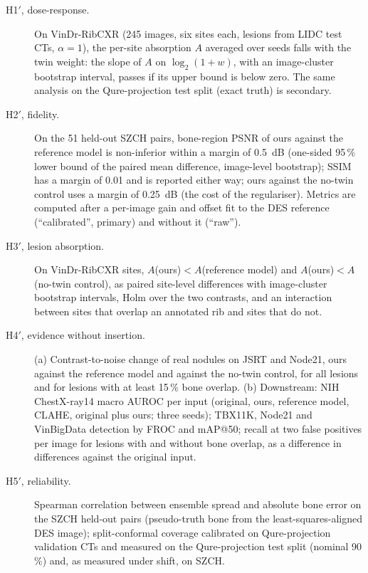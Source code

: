 \begin{description}
\item[H1$'$, dose-response.] On VinDr-RibCXR (245 images, six sites each, lesions from LIDC test CTs, $\alpha=1$), the per-site absorption $A$ averaged over
 seeds falls with the twin weight: the slope of $A$ on $\log_2(1+w)$, with an image-cluster bootstrap interval, passes if its upper bound is below zero.
 The same analysis on the Qure-projection test split (exact truth) is secondary.
\item[H2$'$, fidelity.] On the 51 held-out SZCH pairs, bone-region PSNR of ours against the reference model is non-inferior within a margin of 0.5~dB
 (one-sided 95\,\% lower bound of the paired mean difference, image-level bootstrap); SSIM has a margin of 0.01 and is reported either way; ours against the
 no-twin control uses a margin of 0.25~dB (the cost of the regulariser). Metrics are computed after a per-image gain and offset fit to the DES reference
 (``calibrated'', primary) and without it (``raw'').
\item[H3$'$, lesion absorption.] On VinDr-RibCXR sites, $A$(ours)$<A$(reference model) and $A$(ours)$<A$(no-twin control), as paired site-level
 differences with image-cluster bootstrap intervals, Holm over the two contrasts, and an interaction between sites that overlap an annotated rib and sites
 that do not.
\item[H4$'$, evidence without insertion.] (a) Contrast-to-noise change of real nodules on JSRT and Node21, ours against the reference model and against
 the no-twin control, for all lesions and for lesions with at least 15\,\% bone overlap. (b) Downstream: NIH ChestX-ray14 macro AUROC per input
 (original, ours, reference model, CLAHE, original plus ours; three seeds); TBX11K, Node21 and VinBigData detection by FROC and mAP@50; recall at two false
 positives per image for lesions with and without bone overlap, as a difference in differences against the original input.
\item[H5$'$, reliability.] Spearman correlation between ensemble spread and absolute bone error on the SZCH held-out pairs (pseudo-truth bone from the
 least-squares-aligned DES image); split-conformal coverage calibrated on Qure-projection validation CTs and measured on the Qure-projection test split
 (nominal 90\,\%) and, as measured under shift, on SZCH.
\end{description}

